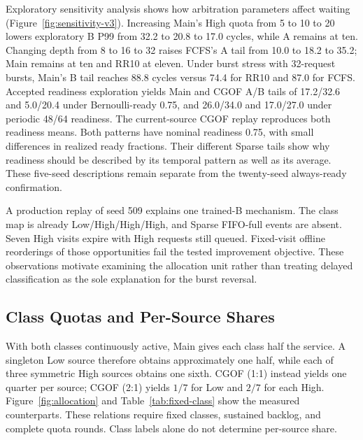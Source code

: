 Exploratory sensitivity analysis shows how arbitration parameters affect waiting (Figure~\ref{fig:sensitivity-v3}). Increasing Main's High quota from 5 to 10 to 20 lowers exploratory B P99 from 32.2 to 20.8 to 17.0 cycles, while A remains at ten. Changing depth from 8 to 16 to 32 raises FCFS's A tail from 10.0 to 18.2 to 35.2; Main remains at ten and RR10 at eleven. Under burst stress with 32-request bursts, Main's B tail reaches 88.8 cycles versus 74.4 for RR10 and 87.0 for FCFS. Accepted readiness exploration yields Main and CGOF A/B tails of 17.2/32.6 and 5.0/20.4 under Bernoulli-ready 0.75, and 26.0/34.0 and 17.0/27.0 under periodic 48/64 readiness. The current-source CGOF replay reproduces both readiness means. Both patterns have nominal readiness 0.75, with small differences in realized ready fractions. Their different Sparse tails show why readiness should be described by its temporal pattern as well as its average. These five-seed descriptions remain separate from the twenty-seed always-ready confirmation.

A production replay of seed 509 explains one trained-B mechanism. The class map is already Low/High/High/High, and Sparse FIFO-full events are absent. Seven High visits expire with High requests still queued. Fixed-visit offline reorderings of those opportunities fail the tested improvement objective. These observations motivate examining the allocation unit rather than treating delayed classification as the sole explanation for the burst reversal.

\subsection{Class Quotas and Per-Source Shares}
\label{sec:allocation}

With both classes continuously active, Main gives each class half the service. A singleton Low source therefore obtains approximately one half, while each of three symmetric High sources obtains one sixth. CGOF (1:1) instead yields one quarter per source; CGOF (2:1) yields $1/7$ for Low and $2/7$ for each High. Figure~\ref{fig:allocation} and Table~\ref{tab:fixed-class} show the measured counterparts. These relations require fixed classes, sustained backlog, and complete quota rounds. Class labels alone do not determine per-source share.

